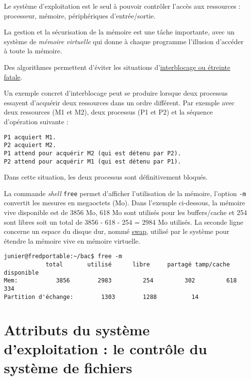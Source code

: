 \documentclass[
  11pt,
]{article}
\newcounter{thme}
\newcounter{alg}
\newcounter{prog}
\begin{document}
Le système d'exploitation est le seul à pouvoir contrôler l'accès aux
ressources : processeur, mémoire, périphériques d'entrée/sortie.

La gestion et la sécurisation de la mémoire est une tâche importante,
avec un système de \emph{mémoire virtuelle} qui donne à chaque programme
l'illusion d'accéder à toute la mémoire.

Des algorithmes permettent d'éviter les situations
d'\href{https://fr.wikipedia.org/wiki/Interblocage}{interblocage ou
étreinte fatale}.

Un exemple concret d'interblocage peut se produire lorsque deux
processus essayent d'acquérir deux ressources dans un ordre différent.
Par exemple avec deux ressources (M1 et M2), deux processus (P1 et P2)
et la séquence d'opération suivante :

\begin{verbatim}
P1 acquiert M1.
P2 acquiert M2.
P1 attend pour acquérir M2 (qui est détenu par P2).
P2 attend pour acquérir M1 (qui est détenu par P1).
\end{verbatim}

Dans cette situation, les deux processus sont définitivement bloqués.

La commande \emph{shell} \texttt{free} permet d'afficher l'utilisation
de la mémoire, l'option \texttt{-m} convertit les mesures en megaoctets
(Mo). Dans l'exemple ci-dessous, la mémoire vive disponible est de 3856
Mo, 618 Mo sont utilisés pour les buffers/cache et 254 sont libres soit
un total de 3856 - 618 - 254 = 2984 Mo utilisés. La seconde ligne
concerne un espace du disque dur, nommé
\href{https://doc.ubuntu-fr.org/swap}{swap}, utilisé par le système pour
étendre la mémoire vive en mémoire virtuelle.

\begin{verbatim}
junier@fredportable:~/bac$ free -m
            total       utilisé      libre     partagé tamp/cache   disponible
Mem:           3856        2983         254         302         618         334
Partition d'échange:        1303        1288          14
\end{verbatim}

\hypertarget{attributs-du-systuxe8me-dexploitation-le-contruxf4le-du-systuxe8me-de-fichiers}{%
\section{Attributs du système d'exploitation : le contrôle du système de
fichiers}\label{attributs-du-systuxe8me-dexploitation-le-contruxf4le-du-systuxe8me-de-fichiers}}
\end{document}

